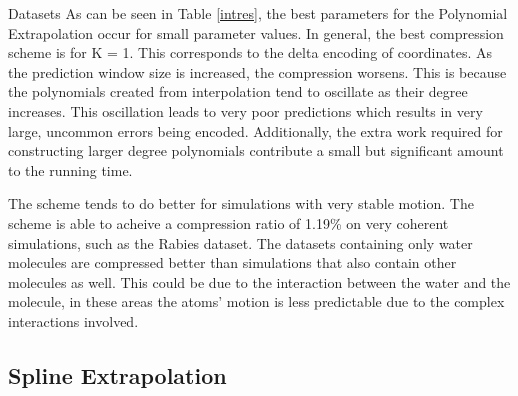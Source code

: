 \documentclass[a4paper,11pt]{report}
\begin{document}
\begin{section}{Datasets}
As can be seen in Table \ref{intres}, the best parameters for the Polynomial Extrapolation occur for small parameter values. In general, the best compression scheme is for K = 1. This corresponds to the delta encoding of coordinates. As the prediction window size is increased, the compression worsens. This is because the polynomials created from interpolation tend to oscillate as their degree increases. This oscillation leads to very poor predictions which results in very large, uncommon errors being encoded. Additionally, the extra work required for constructing larger degree polynomials contribute a small but significant amount to the running time.

The scheme tends to do better for simulations with very stable motion. The scheme is able to acheive a compression ratio of 1.19\% on very coherent simulations, such as the Rabies dataset. The datasets containing only water molecules are compressed better than simulations that also contain other molecules as well. This could be due to the interaction between the water and the molecule, in these areas the atoms' motion is less predictable due to the complex interactions involved.

\subsection{Spline Extrapolation}

\begin{table}
\begin{center}
\caption{Compression information for \textbf{Spline Extrapolation} using different prediction window parameters. The format is the same as in Table \ref{intres}.}
\end{center}
\label{res_spline}
\end{table}


\end{section}
\end{document}
